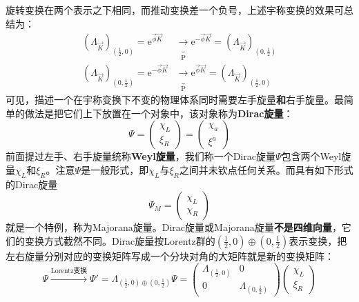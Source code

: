 旋转变换在两个表示之下相同，而推动变换差一个负号，上述宇称变换的效果可总结为：
\begin{align}
\label{equ3.224}
    (\Lambda_{\vec{K}})_{(\frac{1}{2}, 0)} = \mathrm{e}^{\vec{\phi} \vec{K}} &\underbrace{\rightarrow}_{\mathrm{P}} \mathrm{e}^{- \vec{\phi} \vec{K}} = (\Lambda_{\vec{K}})_{(0, \frac{1}{2})} \\
\label{equ3.225}
    (\Lambda_{\vec{K}})_{(0, \frac{1}{2})} = \mathrm{e}^{- \vec{\phi} \vec{K}} &\underbrace{\rightarrow}_{\mathrm{P}} \mathrm{e}^{\vec{\phi} \vec{K}} = (\Lambda_{\vec{K}})_{(\frac{1}{2}, 0)}
\end{align}
可见，描述一个在宇称变换下不变的物理体系同时需要左手旋量{\bf 和}右手旋量。最简单的做法是把它们上下放置在一个对象中，该对象称为{\bf Dirac旋量}：
\begin{equation}
\label{equ3.226}
    \Psi =
        \begin{pmatrix}
            \chi_L \\ \xi_R
        \end{pmatrix}
    =
        \begin{pmatrix}
            \chi_a \\ \xi^{\dot{a}}
        \end{pmatrix}
\end{equation}
前面提过左手、右手旋量统称{\bf Weyl旋量}，我们称一个Dirac旋量$\Psi$包含两个Weyl旋量$\chi_L$和$\xi_R$。注意$\Psi$是一般形式，即$\chi_L$与$\xi_R$之间并未钦点任何关系。而具有如下形式的Dirac旋量
\begin{equation}
\label{equ3.227}
    \Psi_{M} =
        \begin{pmatrix}
            \chi_L \\ \chi_R
        \end{pmatrix}
\end{equation}
就是一个特例，称为Majorana旋量。Dirac旋量或Majorana旋量{\bf 不是四维向量}，它们的变换方式截然不同。Dirac旋量按Lorentz群的$(\frac{1}{2}, 0) \oplus (0, \frac{1}{2})$表示变换，把左右旋量分别对应的变换矩阵写成一个分块对角的大矩阵就是新的变换矩阵：
\begin{equation}
\label{equ3.228}
    \Psi \stackrel{\text{Lorentz变换}}{\longrightarrow} \Psi' = \Lambda_{(\frac{1}{2}, 0) \oplus (0, \frac{1}{2})} \Psi =
        \begin{pmatrix}
            \Lambda_{(\frac{1}{2}, 0)} & 0 \\
            0 & \Lambda_{(0, \frac{1}{2})}
        \end{pmatrix}
        \begin{pmatrix}
            \chi_L \\ \xi_R
        \end{pmatrix}
\end{equation}
